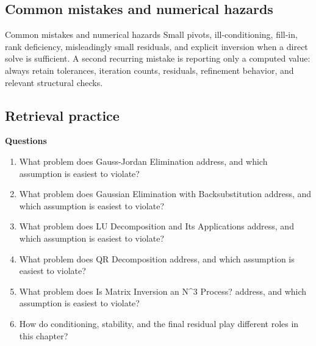 \documentclass[10pt,letterpaper]{article}
\begin{document}
\subsection*{Common mistakes and numerical hazards}
\begin{warnbox}{Common mistakes and numerical hazards}
Small pivots, ill-conditioning, fill-in, rank deficiency, misleadingly small residuals, and explicit inversion when a direct solve is sufficient.  A second recurring mistake is reporting only a computed value: always retain tolerances, iteration counts, residuals, refinement behavior, and relevant structural checks.
\end{warnbox}

\subsection*{Retrieval practice}
\textbf{Questions}
\begin{enumerate}
\item What problem does Gauss-Jordan Elimination address, and which assumption is easiest to violate?
\item What problem does Gaussian Elimination with Backsubstitution address, and which assumption is easiest to violate?
\item What problem does LU Decomposition and Its Applications address, and which assumption is easiest to violate?
\item What problem does QR Decomposition address, and which assumption is easiest to violate?
\item What problem does Is Matrix Inversion an N\textasciicircum{}3 Process? address, and which assumption is easiest to violate?
\item How do conditioning, stability, and the final residual play different roles in this chapter?
\end{enumerate}
\end{document}
